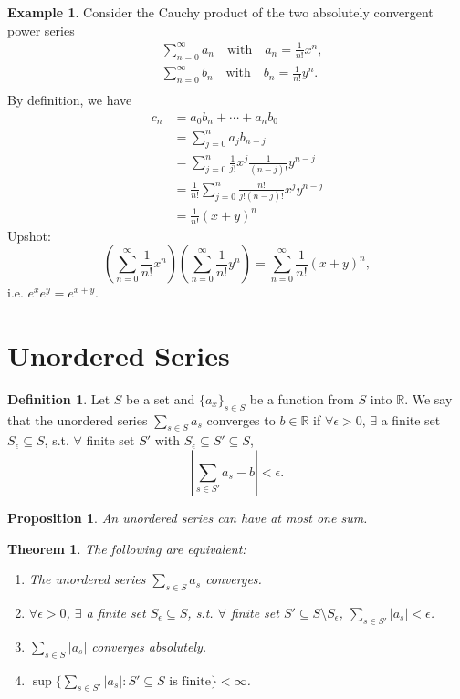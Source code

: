 \documentclass[12pt]{article}
\theoremstyle{plain}
\newtheorem{thm}{Theorem}
\newtheorem*{prop}{Proposition}
\theoremstyle{definition}
\newtheorem*{defn}{Definition}
\newtheorem*{eg}{Example}
\begin{document}
\begin{eg}
    Consider the Cauchy product of the two absolutely convergent power series
    $$\begin{aligned}
        &\sum_{n=0}^\infty a_n\quad\text{with}\quad a_n=\frac{1}{n!}x^n,\\
        &\sum_{n=0}^\infty b_n\quad\text{with}\quad b_n=\frac{1}{n!}y^n.\\
    \end{aligned}$$
    By definition, we have
    $$\begin{aligned}
        c_n &= a_0b_n+\cdots + a_nb_0 \\
        &= \sum_{j=0}^n a_j b_{n-j}\\
        &= \sum_{j=0}^n \frac{1}{j!}x^j \frac{1}{(n-j)!}y^{n-j}\\
        &= \frac{1}{n!}\sum_{j=0}^n\frac{n!}{j!(n-j)!}x^j y^{n-j}\\
        &= \frac{1}{n!}(x+y)^n
    \end{aligned}$$
    Upshot:
    $$\left( \sum_{n=0}^\infty \frac{1}{n!}x^n\right)
    \left(\sum_{n=0}^\infty \frac{1}{n!} y^n\right)
    =\sum_{n=0}^\infty \frac{1}{n!}(x+y)^n,$$
    i.e. $e^x e^y = e^{x+y}$.
\end{eg}

\section*{Unordered Series}
\begin{defn}
    Let $S$ be a set and $\{a_x\}_{s\in S}$ be a function from $S$ into $\mathbb{R}$.
    We say that the unordered series $\sum_{s\in S}a_s$ converges to $b\in\mathbb{R}$ if $\forall
    \epsilon>0$, $\exists$ a finite set $S_\epsilon\subseteq S$, s.t. $\forall$ finite set $S'$ with
    $S_\epsilon\subseteq S'\subseteq S$,
    \[\left| \sum_{s\in S'}a_s-b\right| < \epsilon.\]
\end{defn}
\begin{prop}
    An unordered series can have at most one sum.
\end{prop}

\begin{thm}
    The following are equivalent:
    \begin{enumerate}
        \item The unordered series $\sum_{s\in S}a_s$ converges.
        \item $\forall \epsilon>0$, $\exists$ a finite set $S_\epsilon\subseteq S$, s.t. $\forall$ finite
        set $S'\subseteq S\setminus S_\epsilon$, $\sum_{s\in S'}|a_s|<\epsilon$.
        \item $\sum_{s\in S}|a_s|$ converges absolutely.
        \item $\sup\{\sum_{s\in S'} |a_s| : S'\subseteq S \text{ is finite}\} < \infty$.
    \end{enumerate}
\end{thm}
\end{document}
